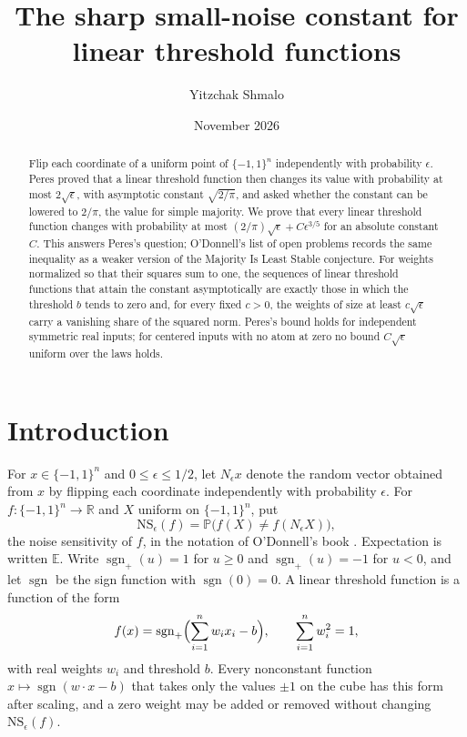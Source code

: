 \documentclass[11pt]{amsart}
\title{The sharp small-noise constant for linear threshold functions}
\author{Yitzchak Shmalo}
\date{November 2026}
\theoremstyle{remark}
\numberwithin{equation}{section}
\newcommand{\PP}{\mathbb{P}}
\newcommand{\EE}{\mathbb{E}}
\newcommand{\R}{\mathbb{R}}
\newcommand{\sgnp}{\operatorname{sgn}_+}
\newcommand{\sgnz}{\operatorname{sgn}}
\begin{document}
\begin{abstract}
Flip each coordinate of a uniform point of $\{-1,1\}^n$ independently with probability $\epsilon$. Peres proved that a linear threshold function then changes its value with probability at most $2\sqrt\epsilon$, with asymptotic constant $\sqrt{2/\pi}$, and asked whether the constant can be lowered to $2/\pi$, the value for simple majority. We prove that every linear threshold function changes with probability at most $(2/\pi)\sqrt\epsilon+C\epsilon^{3/5}$ for an absolute constant $C$. This answers Peres's question; O'Donnell's list of open problems records the same inequality as a weaker version of the Majority Is Least Stable conjecture. For weights normalized so that their squares sum to one, the sequences of linear threshold functions that attain the constant asymptotically are exactly those in which the threshold $b$ tends to zero and, for every fixed $c>0$, the weights of size at least $c\sqrt\epsilon$ carry a vanishing share of the squared norm. Peres's bound holds for independent symmetric real inputs; for centered inputs with no atom at zero no bound $C\sqrt\epsilon$ uniform over the laws holds.
\end{abstract}
\maketitle

\section{Introduction}

For $x\in\{-1,1\}^n$ and $0\le\epsilon\le1/2$, let $N_\epsilon x$ denote the random vector obtained from $x$ by flipping each coordinate independently with probability $\epsilon$. For $f\colon\{-1,1\}^n\to\R$ and $X$ uniform on $\{-1,1\}^n$, put
\[
\mathrm{NS}_\epsilon(f)=\PP\bigl(f(X)\ne f(N_\epsilon X)\bigr),
\]
the noise sensitivity of $f$, in the notation of O'Donnell's book \cite{OD14}. Expectation is written $\EE$. Write $\sgnp(u)=1$ for $u\ge0$ and $\sgnp(u)=-1$ for $u<0$, and let $\sgnz$ be the sign function with $\sgnz(0)=0$. A linear threshold function is a function of the form
\begin{equation}\label{eq:ltf}
f(x)=\sgnp\Bigl(\sum_{i=1}^n w_ix_i-b\Bigr),\qquad \sum_{i=1}^n w_i^2=1,
\end{equation}
with real weights $w_i$ and threshold $b$. Every nonconstant function $x\mapsto\sgnz(w\cdot x-b)$ that takes only the values $\pm1$ on the cube has this form after scaling, and a zero weight may be added or removed without changing $\mathrm{NS}_\epsilon(f)$.
\end{document}
